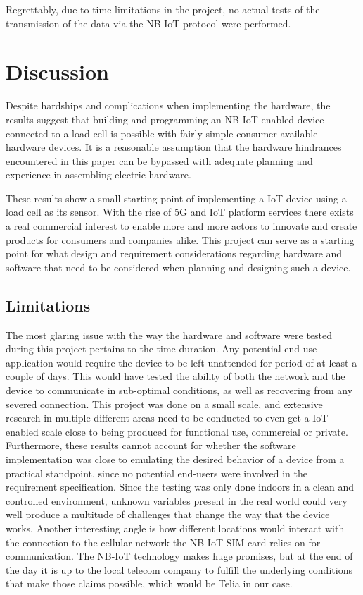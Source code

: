 Regrettably, due to time limitations in the project, no actual tests of the transmission of the data via the NB-IoT protocol were performed.

\section{Discussion}
Despite hardships and complications when implementing the hardware, the results suggest that building and programming an NB-IoT enabled device connected to a load cell is possible with fairly simple consumer available hardware devices. It is a reasonable assumption that the hardware hindrances encountered in this paper can be bypassed with adequate planning and experience in assembling electric hardware.

These results show a small starting point of implementing a IoT device using a load cell as its sensor. With the rise of 5G and IoT platform services there exists a real commercial interest to enable more and more actors to innovate and create products for consumers and companies alike. This project can serve as a starting point for what design and requirement considerations regarding hardware and software that need to be considered when planning and designing such a device.

\subsection{Limitations}
The most glaring issue with the way the hardware and software were tested during this project pertains to the time duration. Any potential end-use application would require the device to be left unattended for period of at least a couple of days. This would have tested the ability of both the network and the device to communicate in sub-optimal conditions, as well as recovering from any severed connection.
This project was done on a small scale, and extensive research in multiple different areas need to be conducted to even get a IoT enabled scale close to being produced for functional use, commercial or private.
Furthermore, these results cannot account for whether the software implementation was close to emulating the desired behavior of a device from a practical standpoint, since no potential end-users were involved in the requirement specification.
Since the testing was only done indoors in a clean and controlled environment, unknown variables present in the real world could very well produce a multitude of challenges that change the way that the device works. Another interesting angle is how different locations would interact with the connection to the cellular network the NB-IoT SIM-card relies on for communication. The NB-IoT technology makes huge promises, but at the end of the day it is up to the local telecom company to fulfill the underlying conditions that make those claims possible, which would be Telia in our case.

